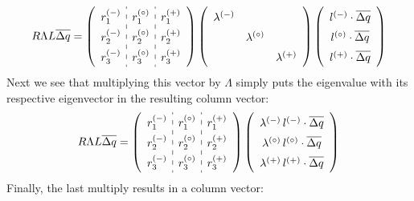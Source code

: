 \begin{equation}
\renewcommand{\arraystretch}{1.5}
R\Lambda L \overline{\Delta q} =
   \left ( \begin{array}{c:c:c}
             r_1^\evm & r_1^\evz & r_1^\evp \\
             r_2^\evm & r_2^\evz & r_2^\evp \\
             r_3^\evm & r_3^\evz & r_3^\evp \end{array} \right )
   \left ( \begin{array}{ccc}
             \lambda^\evm &              & \\
                          & \lambda^\evz & \\
                          &              & \lambda^\evp \end{array} \right )
   \left ( \begin{array}{c}
            l^\evm \cdot \overline{\Delta q} \\
            l^\evz \cdot \overline{\Delta q} \\
            l^\evp \cdot \overline{\Delta q} \end{array} \right )
\renewcommand{\arraystretch}{1.0}
\end{equation}
Next we see that multiplying this vector by $\Lambda$ simply puts the
eigenvalue with its respective eigenvector in the resulting column vector:
\begin{equation}
\renewcommand{\arraystretch}{1.5}
R\Lambda L \overline{\Delta q} =
   \left ( \begin{array}{c:c:c}
             r_1^\evm & r_1^\evz & r_1^\evp \\
             r_2^\evm & r_2^\evz & r_2^\evp \\
             r_3^\evm & r_3^\evz & r_3^\evp \end{array} \right )
   \left ( \begin{array}{c}
            \lambda^\evm \, l^\evm \cdot \overline{\Delta q} \\
            \lambda^\evz \, l^\evz \cdot \overline{\Delta q} \\
            \lambda^\evp \, l^\evp \cdot \overline{\Delta q} \end{array} \right )
\renewcommand{\arraystretch}{1.0}
\end{equation}
Finally, the last multiply results in a column vector:
